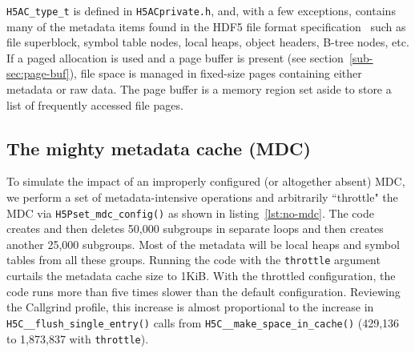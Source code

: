 \texttt{H5AC\_type\_t} is defined in \texttt{H5ACprivate.h}, and, with a few exceptions, contains many of the metadata items found in the HDF5 file format specification~\cite{ffmt} such as file superblock, symbol table nodes, local heaps, object headers, B-tree nodes, etc. If a paged allocation is used and a page buffer is present (see section~\ref{sub-sec:page-buf}), file space is managed in fixed-size pages containing either metadata or raw data. The page buffer is a memory region set aside to store a list of frequently accessed file pages.

\subsection{The mighty metadata cache (MDC)}

To simulate the impact of an improperly configured (or altogether absent) MDC, we perform a set of metadata-intensive operations and arbitrarily ``throttle" the MDC via \texttt{H5Pset\_mdc\_config()} as shown in listing~\ref{lst:no-mdc}. The code creates and then deletes 50,000 subgroups in separate loops and then creates another 25,000 subgroups. Most of the metadata will be local heaps and symbol tables from all these groups. Running the code with the \texttt{throttle} argument curtails the metadata cache size to 1KiB. With the throttled configuration, the code runs more than five times slower than the default configuration. Reviewing the Callgrind profile, this increase is almost proportional to the increase in \texttt{H5C\_\_flush\_single\_entry()} calls from \texttt{H5C\_\_make\_space\_in\_cache()} (429,136 to 1,873,837 with \texttt{throttle}).


